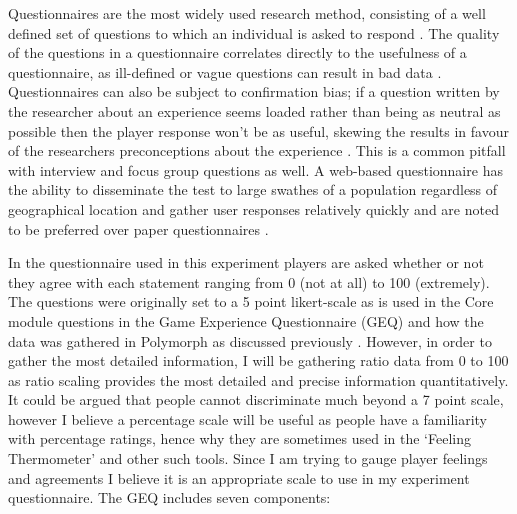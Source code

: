 \documentclass[journal]{IEEEtran}
\begin{document}
Questionnaires are the most widely used research method, consisting of a well defined set of questions to which an individual is asked to respond \cite{goddard2006designing}. The quality of the questions in a questionnaire correlates directly to the usefulness of a questionnaire, as ill-defined or vague questions can result in bad data \cite{litwin1995measure}. Questionnaires can also be subject to confirmation bias; if a question written by the researcher about an experience seems loaded rather than being as neutral as possible then the player response won't be as useful, skewing the results in favour of the researchers preconceptions about the experience \cite{fowler1995improving}. This is a common pitfall with interview and focus group questions as well. A web-based questionnaire has the ability to disseminate the test to large swathes of a population regardless of geographical location and gather user responses relatively quickly and are noted to be preferred over paper questionnaires \cite{evans2005value}.

In the questionnaire used in this experiment players are asked whether or not they agree with each statement ranging from 0 (not at all) to 100 (extremely). The questions were originally set to a 5 point likert-scale as is used in the Core module questions in the Game Experience Questionnaire (GEQ) \cite{ijsselsteijn2013game} \cite{poels2007d3} and how the data was gathered in Polymorph as discussed previously \cite{jennings2010polymorph}. However, in order to gather the most detailed information, I will be gathering ratio data from 0 to 100 as ratio scaling provides the most detailed and precise information quantitatively. It could be argued that people cannot discriminate much beyond a 7 point scale, however I believe a percentage scale will be useful as people have a familiarity with percentage ratings, hence why they are sometimes used in the `Feeling Thermometer' and other such tools. Since I am trying to gauge player feelings and agreements I believe it is an appropriate scale to use in my experiment questionnaire. The GEQ includes seven components: 

\end{document}
